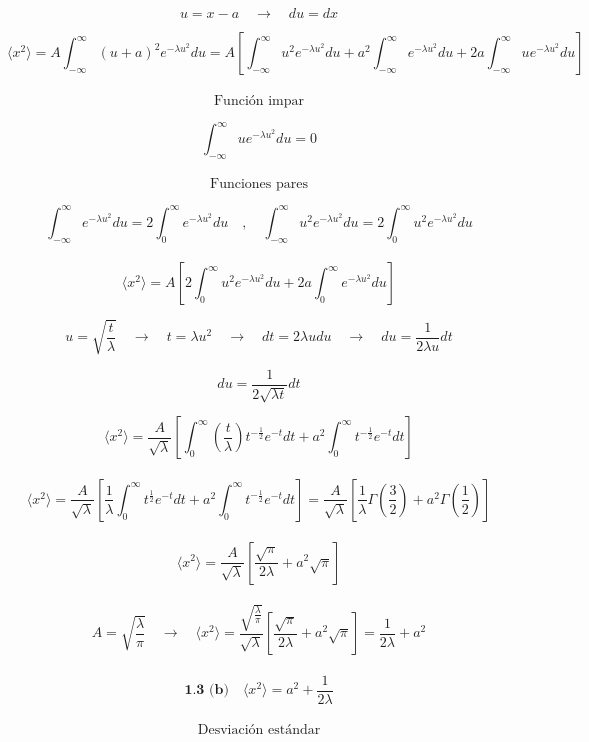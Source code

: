 \documentclass[10pt,a4papper]{article}
\begin{document}
\[u=x-a\quad\to\quad du=dx\]

\[\langle x^2\rangle=
A\int_{-\infty}^\infty (u+a)^2e^{-\lambda u^2}du=
A\left[\int_{-\infty}^\infty u^2e^{-\lambda u^2}du+a^2\int_{-\infty}^\infty e^{-\lambda u^2}du+2a\int_{-\infty}^\infty ue^{-\lambda u^2}du\right]\]\\

\[\text{Función impar}\]

\[\int_{-\infty}^\infty ue^{-\lambda u^2}du=0\]\\

\[\text{Funciones pares}\]

\[\int_{-\infty}^\infty e^{-\lambda u^2}du=2\int_0^\infty e^{-\lambda u^2}du\quad,\quad
\int_{-\infty}^\infty u^2e^{-\lambda u^2}du=2\int_0^\infty u^2e^{-\lambda u^2}du\]\\

\[\langle x^2\rangle=A\left[2\int_0^\infty u^2e^{-\lambda u^2}du+2a\int_0^\infty e^{-\lambda u^2}du\right]\]

\newpage
\[u=\sqrt{\frac{t}{\lambda}}\quad\to\quad t=\lambda u^2\quad\to\quad dt=2\lambda udu\quad\to\quad du=\frac{1}{2\lambda u}dt\]

\[du=\frac{1}{2\sqrt{\lambda t}}dt\]

\[\langle x^2\rangle=
\frac{A}{\sqrt{\lambda}}\left[
  \int_0^\infty\left(\frac{t}{\lambda}\right)t^{-\frac{1}{2}}e^{-t}dt
  +a^2\int_0^\infty t^{-\frac{1}{2}}e^{-t}dt\right]\]\\

\[\langle x^2\rangle=
\frac{A}{\sqrt{\lambda}}\left[
  \frac{1}{\lambda}\int_0^\infty t^\frac{1}{2}e^{-t}dt
  +a^2\int_0^\infty t^{-\frac{1}{2}}e^{-t}dt\right]=
\frac{A}{\sqrt{\lambda}}\left[\frac{1}{\lambda}\Gamma\left(\frac{3}{2}\right)+a^2\Gamma\left(\frac{1}{2}\right)\right]\]\\

\[\langle x^2\rangle=
\frac{A}{\sqrt{\lambda}}\left[\frac{\sqrt{\pi}}{2\lambda}+a^2\sqrt{\pi}\right]\]\\

\[A=\sqrt{\frac{\lambda}{\pi}}\quad\to\quad
\langle x^2\rangle=
\frac{\sqrt{\frac{\lambda}{\pi}}}{\sqrt{\lambda}}\left[\frac{\sqrt{\pi}}{2\lambda}+a^2\sqrt{\pi}\right]=
\frac{1}{2\lambda}+a^2\]\\

\[\boxed{\textbf{1.3 (b)}\quad\langle x^2\rangle=a^2+\frac{1}{2\lambda}}\]\\

\[\text{Desviación estándar}\]
\end{document}
